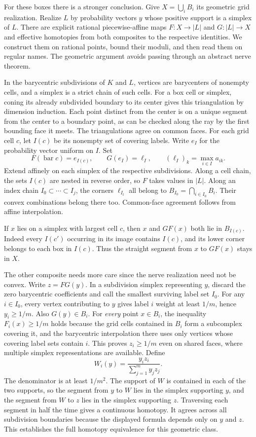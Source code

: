 For these boxes there is a stronger conclusion. Give $X=\bigcup_i B_i$
its geometric grid realization. Realize $L$ by probability vectors $y$
whose positive support is a simplex of $L$. There are explicit rational
piecewise-affine maps $F:X\to |L|$ and $G:|L|\to X$ and effective
homotopies from both composites to the respective identities. We construct
them on rational points, bound their moduli, and then read them on regular
names. The geometric argument avoids passing through an abstract nerve
theorem.

In the barycentric subdivisions of $K$ and $L$, vertices are
barycenters of nonempty cells, and a simplex is a strict chain of such cells.
For a box cell or simplex, coning its already subdivided boundary to its
center gives this triangulation by dimension induction. Each point distinct
from the center is on a unique segment from the center to a boundary point,
as can be checked along the ray by the first bounding face it meets. The
triangulations agree on common faces. For each grid cell $c$, let $I(c)$
be its nonempty set of covering labels. Write $e_I$ for the probability
vector uniform on $I$. Set
\[
    F(\operatorname{bar}c)=e_{I(c)},\qquad
    G(e_I)=\ell_I,\qquad
    (\ell_I)_k=\max_{i\in I}a_{ik}.
\]
Extend affinely on each simplex of the respective subdivisions. Along a
cell chain, the sets $I(c)$ are nested in reverse order, so $F$ takes
values in $|L|$. Along an index chain $I_0\subset\cdots\subset I_j$,
the corners $\ell_{I_t}$ all belong to $B_{I_0}=\bigcap_{i\in I_0}B_i$.
Their convex combinations belong there too. Common-face agreement follows
from affine interpolation.

If $x$ lies on a simplex with largest cell $c$, then $x$ and $GF(x)$
both lie in $B_{I(c)}$. Indeed every $I(c')$ occurring in its image
contains $I(c)$, and its lower corner belongs to each box in $I(c)$.
Thus the straight segment from $x$ to $GF(x)$ stays in $X$.

The other composite needs more care since the nerve realization need not be
convex. Write $z=FG(y)$. In a subdivision simplex representing $y$, discard
the zero barycentric coefficients and call the smallest surviving label set
$I_0$. For any $i\in I_0$, every vertex contributing to $y$ gives label $i$
weight at least $1/m$, hence $y_i\ge 1/m$. Also $G(y)\in B_i$. For
\emph{every} point $x\in B_i$, the inequality $F_i(x)\ge1/m$ holds because the grid cells
contained in $B_i$ form a subcomplex covering it, and the barycentric
interpolation there uses only vertices whose covering label sets contain $i$.
This proves $z_i\ge1/m$ even on shared faces, where multiple simplex
representations are available. Define
\[
 W_i(y)=\frac{y_i z_i}{\sum_{j=1}^{m}y_jz_j}.
\]
The denominator is at least $1/m^2$. The support of $W$ is contained in
each of the two supports, so the segment from $y$ to $W$ lies in the
simplex supporting $y$, and the segment from $W$ to $z$ lies in the simplex
supporting $z$. Traversing each segment in half the time gives a continuous
homotopy. It agrees across all subdivision boundaries because the displayed
formula depends only on $y$ and $z$. This establishes the full homotopy
equivalence for this geometric class.

